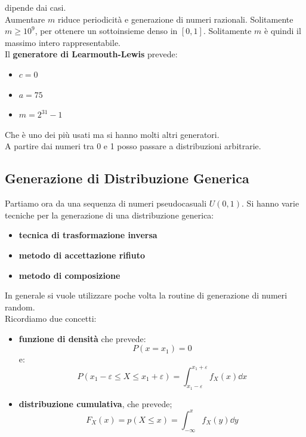 \documentclass[a4paper,12pt, oneside]{book}
\begin{document}
dipende dai casi.\\
Aumentare $m$ riduce periodicità e generazione di numeri razionali. Solitamente
$m\geq 10^9$, per ottenere un sottoinsieme denso in $[0,1]$. Solitamente $m$ è
quindi il massimo intero rappresentabile.\\
Il \textbf{generatore di Learmouth-Lewis} prevede:
\begin{itemize}
  \item $c=0$
  \item $a=75$
  \item $m=2^{31}-1$
\end{itemize}
Che è uno dei più usati ma si hanno molti altri generatori.\\
A partire dai numeri tra 0 e 1 posso passare a distribuzioni arbitrarie.\\
\subsection{Generazione di Distribuzione Generica}
Partiamo ora da una sequenza di numeri pseudocasuali $U(0,1)$. Si hanno varie
tecniche per la generazione di una distribuzione generica:
\begin{itemize}
  \item \textbf{tecnica di trasformazione inversa}
  \item \textbf{metodo di accettazione rifiuto}
  \item \textbf{metodo di composizione}
\end{itemize}
In generale si vuole utilizzare poche volta la routine di generazione di numeri
random. \\
Ricordiamo due concetti:
\begin{itemize}
  \item \textbf{funzione di densità} che prevede:
  \[P(x=x_1)=0\]
  e:
  \[P(x_1-\varepsilon\leq X\leq
    x_1+\varepsilon)=\int_{x_1-\varepsilon}^{x_1+\varepsilon} f_X(x)\dd{x}\]
  \item \textbf{distribuzione cumulativa}, che prevede;
  \[F_X(x)=p(X\leq x)=\int_{-\infty}^x f_X(y)\dd{y}\]
\end{itemize}
\end{document}
